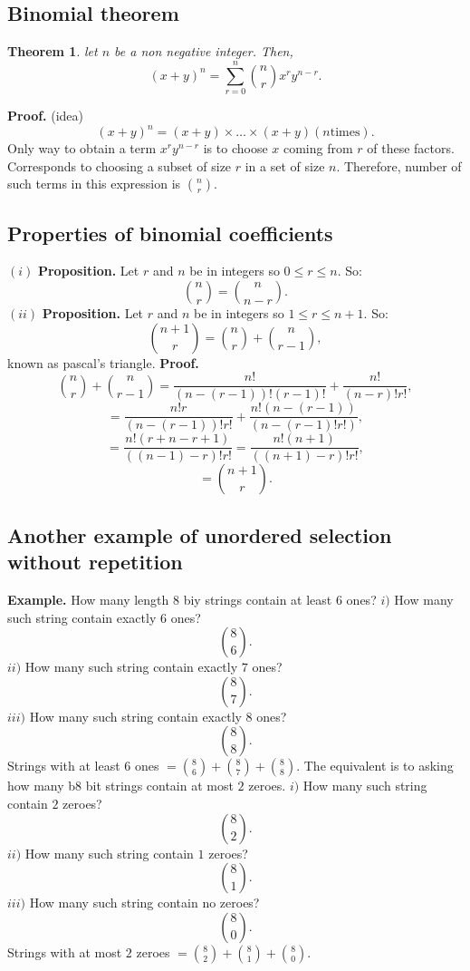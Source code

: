 \documentclass{article}
\newtheorem{theorem}{Theorem}                                       %
\begin{document}
\subsection{Binomial theorem}
\begin{theorem}
  let $n$ be a non negative integer. Then,
  $$(x + y)^n = \sum_{r = 0}^{n} \binom{n}{r} x^ry^{n - r}.$$
\end{theorem}
\textbf{Proof. } (idea)
$$(x + y)^n = (x + y) \times \dots \times (x + y) (n \text{times}).$$
Only way to obtain a term $x^ry^{n - r}$ is to choose $x$ coming from $r$ of these factors. 
\newline
\newline
Corresponds to choosing a subset of size $r$ in a set of size $n$. Therefore, number of such terms in this expression is $\binom{n}{r}.$
\newpage
\subsection{Properties of binomial coefficients}
$(i) $ \textbf{Proposition. } Let $r$ and $n$ be in integers so $0 \leq r \leq n.$ So:
$$\binom{n}{r} = \binom{n}{n - r}.$$
$(ii) $ \textbf{Proposition. } Let $r$ and $n$ be in integers so $1 \leq r \leq n + 1.$ So:
$$\binom{n + 1}{r} = \binom{n}{r} + \binom{n}{r - 1},$$ known as pascal's triangle.
\textbf{Proof.} 
\newline
$$\binom{n}{r} + \binom{n}{r - 1} = \frac{n!}{(n - (r - 1))!(r - 1)!} + \frac{n!}{(n - r)!r!},$$
$$ = \frac{n!r}{(n - (r - 1))!r!} + \frac{n!(n - (r - 1))}{(n - (r - 1)!r!)},$$
$$ = \frac{n!(r + n - r + 1)}{((n - 1) - r)!r!} = \frac{n!(n + 1)}{((n + 1) - r)!r!},$$
$$ = \binom{n + 1}{r}.$$
\newpage
\subsection{Another example of unordered selection without repetition}
\textbf{Example. } How many length $8$ biy strings contain at least $6$ ones?
$i) $ How many such string contain exactly $6$ ones?
$$\binom{8}{6}.$$
$ii) $ How many such string contain exactly $7$ ones?
$$\binom{8}{7}.$$
$iii) $ How many such string contain exactly $8$ ones?
$$\binom{8}{8}.$$
Strings with at least $6$ ones $ = \binom{8}{6} + \binom{8}{7} + \binom{8}{8}.$ 
\newline
\newline
The equivalent is to asking how many b$8$ bit strings contain at most $2$ zeroes.
\newline
$i) $ How many such string contain $2$ zeroes?
$$\binom{8}{2}.$$
$ii) $ How many such string contain $1$ zeroes?
$$\binom{8}{1}.$$
$iii) $ How many such string contain no zeroes?
$$\binom{8}{0}.$$
Strings with at most $2$ zeroes $ = \binom{8}{2} + \binom{8}{1} + \binom{8}{0}.$ 
\newpage
\end{document}
